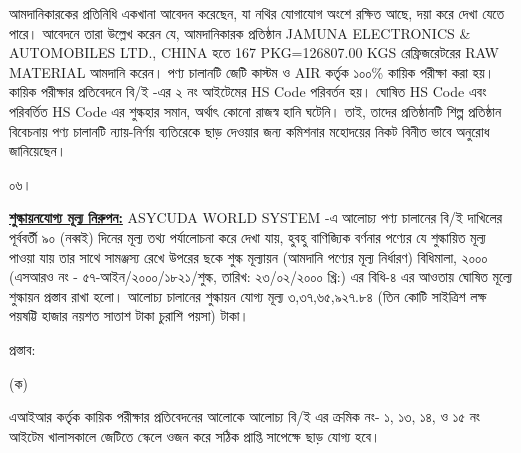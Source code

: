 \documentclass[12pt]{article}
\newcommand{\good}{RAW MATERIAL}
\newcommand{\pkg}{167 PKG=126807.00 KGS}
\newcommand{\co}{CHINA}
\newcommand{\jeal}{JAMUNA ELECTRONICS \& AUTOMOBILES LTD.}
\newcommand{\impn}{\jeal}
\newcommand{\srofs}{এসআরও নং - ৫৭-আইন/২০০০/১৮২১/শুল্ক}
\newcommand{\srofsd}{তারিখ: ২৩/০২/২০০০ খ্রি:}
\begin{document}
\begin{minipage}[t]{0.95\linewidth}
আমদানিকারকের প্রতিনিধি একখানা আবেদন করেছেন, যা নথির যোগাযোগ অংশে রক্ষিত আছে, দয়া করে দেখা যেতে পারে। আবেদনে তারা উল্লেখ করেন যে, আমদানিকারক প্রতিষ্ঠান {\impn},
{\co} হতে {\pkg} রেফ্রিজরেটরের {\good} আমদানি করেন। পণ্য চালানটি জেটি কাস্টম ও AIR কর্তৃক ১০০\% কায়িক পরীক্ষা করা হয়। কায়িক পরীক্ষার প্রতিবেদনে বি/ই -এর ২ নং আইটেমের HS Code পরিবর্তন হয়। ঘোষিত HS Code এবং পরিবর্তিত  HS Code এর শুল্কহার সমান, অর্থাৎ কোনো রাজস্ব হানি ঘটেনি।
তাই, তাদের প্রতিষ্ঠানটি শিল্প প্রতিষ্ঠান বিবেচনায় পণ্য চালানটি ন্যায়-নির্ণয়
ব্যতিরেকে ছাড় দেওয়ার জন্য কমিশনার মহোদয়ের নিকট বিনীত ভাবে অনুরোধ জানিয়েছেন।
\\
\end{minipage}
\begin{minipage}[t]{0.05\linewidth}
০৬।
\end{minipage}
\begin{minipage}[t]{0.95\linewidth}
\underline{\textbf{শুল্কায়নযোগ্য মূল্য নিরুপন:}} ASYCUDA WORLD SYSTEM
-এ আলোচ্য পণ্য চালানের বি/ই দাখিলের পূর্ববর্তী ৯০ (নব্বই) দিনের
মূল্য তথ্য পর্যালোচনা করে দেখা যায়, হুবহু বাণিজ্যিক বর্ণনার পণ্যের যে
শুল্কায়িত মূল্য পাওয়া যায় তার সাথে সামঞ্জস্য রেখে উপরের ছকে শুল্ক
মূল্যায়ন (আমদানি পণ্যের মূল্য নির্ধারণ) বিধিমালা, ২০০০
({\srofs}, {\srofsd})
এর বিধি-৪ এর আওতায় ঘোষিত মূল্যে শুল্কায়ন প্রস্তাব রাখা হলো।
আলোচ্য চালানের শুল্কায়ন যোগ্য মূল্য ৩,৩৭,৬৫,৯২৭.৮৪ (তিন কোটি সাইত্রিশ লক্ষ পয়ষট্টি হাজার নয়শত সাতাশ টাকা চুরাশি পয়সা) টাকা।
\\
\end{minipage}
\begin{minipage}[t]{0.05\linewidth}
\hspace{0em}
\end{minipage}
\begin{minipage}[t]{0.95\linewidth}
প্রস্তাব:
\end{minipage}
\begin{minipage}[t]{0.05\linewidth}
\hspace{0em}
\end{minipage}
\begin{minipage}[t]{0.05\linewidth}
(ক)
\end{minipage}
\begin{minipage}[t]{0.90\linewidth}
এআইআর কর্তৃক কায়িক পরীক্ষার প্রতিবেদনের আলোকে
আলোচ্য বি/ই এর ক্রমিক নং- ১, ১৩, ১৪, ও ১৫ নং আইটেম খালাসকালে জেটিতে স্কেলে ওজন করে সঠিক প্রাপ্তি সাপেক্ষে ছাড় যোগ্য হবে।
\\
\end{minipage}
\end{document}
